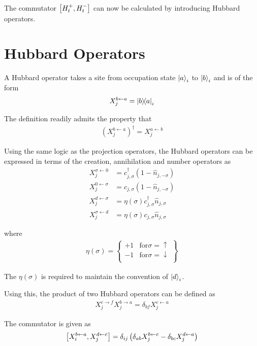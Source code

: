 \documentclass[]{report}
\begin{document}
The commutator $ \comm{H^{+}_{t}}{H^{-}_{t}} $ can now be calculated by introducing Hubbard operators.

\section{Hubbard Operators}
A Hubbard operator takes a site from occupation state $ \ket{a}_i $ to $ \ket{b}_i $ and is of the form
\begin{align}
X^{b \leftarrow a}_{j} = \op{b}{a}_i
\end{align}

The definition readily admits the property that
\begin{align}
\left( X^{b \leftarrow a}_{j}\right) ^{\dagger} = X^{a \leftarrow b}_{j}
\end{align}

Using the same logic as the projection operators, the Hubbard operators can be expressed in terms of the creation, annihilation and number operators as
\begin{align}
X^{\sigma \leftarrow 0}_{j} &= c^{\dagger}_{j, \sigma} (1 - \hat{n}_{j, -\sigma})\\
X^{0 \leftarrow \sigma}_{j} &= c_{j, \sigma} (1 - \hat{n}_{j, -\sigma})\\
X^{d \leftarrow \sigma}_{j} &= \eta(\sigma) c^{\dagger}_{j, \sigma} \hat{n}_{j, \sigma} \\
X^{\sigma \leftarrow d}_{j} &= \eta(\sigma) c_{j, \sigma} \hat{n}_{j, \sigma}
\end{align}

where
\begin{align}
\eta(\sigma) = \left.
\begin{cases}
+1 & \text{for} \sigma = \uparrow\\
-1 & \text{for} \sigma = \downarrow\\
\end{cases}
\right\}
\end{align}

The $ \eta(\sigma) $ is required to maintain the convention of $ \ket{d}_i $.

Using this, the product of two Hubbard operators can be defined as
\begin{align}
X^{c \rightarrow f}_{j} X^{b \rightarrow a}_{j} = \delta_{bf} X^{c \leftarrow a}_{j}
\end{align}

The commutator is given as
\begin{align}
\comm{X^{b \leftarrow a}_{i}}{X^{d \leftarrow c}_{j}} = \delta_{ij} \left( \delta_{ab} X^{b \leftarrow c}_{j} - \delta_{bc} X^{d \leftarrow a}_{j} \right)
\end{align}
\end{document}
